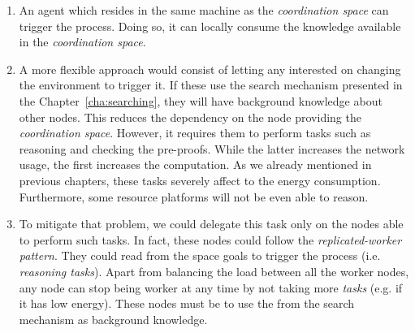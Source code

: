 \begin{enumerate}
  \item An agent which resides in the same machine as the \emph{coordination space} can trigger the process. %
	Doing so, it can locally consume the knowledge available in the \emph{coordination space}.
  \item A more flexible approach would consist of letting any \consumer{} interested on changing the environment to trigger it.
	If these \consumers{} use the search mechanism presented in the Chapter~\ref{cha:searching}, they will have background knowledge about other nodes.
	This reduces the dependency on the node providing the \emph{coordination space}. %
	However, it requires them to perform tasks such as reasoning and checking the pre-proofs.
	While the latter increases the network usage, the first increases the computation.
	As we already mentioned in previous chapters, these tasks severely affect to the energy consumption.
	Furthermore, some resource platforms will not be even able to reason.
  \item To mitigate that problem, we could delegate this task only on the nodes able to perform such tasks.
	In fact, these nodes could follow the \emph{replicated-worker pattern}.
	They could read from the space goals to trigger the process (i.e. \emph{reasoning tasks}).
	Apart from balancing the load between all the worker nodes, any node can stop being worker at any time by not taking more \emph{tasks} (e.g. if it has low energy).
	These nodes must be \consumers{} to use the \clues{} from the search mechanism as background knowledge.
\end{enumerate}





